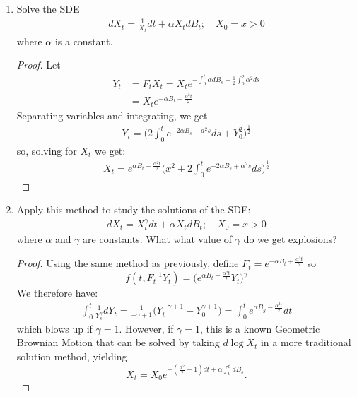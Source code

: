 \documentclass[11pt]{article}
\newcommand{\ga}{\alpha}
\newcommand{\gc}{y}
\renewcommand{\gc}{\gamma}
\begin{document}
\begin{enumerate}
\begin{proof}
 \end{proof}
 \item Solve the SDE \begin{align*}
 d X _ { t } = \frac { 1 } { X _ { t } } d t + \alpha X _ { t } d B _ { t } ; \quad X _ { 0 } = x > 0
 \end{align*}
 where $\ga$ is a constant.
 \begin{proof}
 Let \begin{align*}Y_t &= F_tX_t = X_t e^{-\int_0^t \ga dB_s + \frac{1}{2}\int_0^2 \ga^2 ds}\\
 &= X_t e^{-\ga B_t + \frac{\ga^2 t}{2}}
 \end{align*}
 Separating variables and integrating, we get
 \begin{align*}
 Y_t = \Big( 2 \int_0^t e^{-2 \ga B_s + a^2s} ds + Y_0^2 \Big)^{\frac{1}{2}}
 \end{align*}
 so, solving for $X_t$ we get:
 \begin{align*}
 X_t = e^{\ga B_t -\frac{\ga^2 t}{2}}\Big(x^2 + 2 \int_0^t e^{-2\ga B_s + \ga^2 s} ds \Big)^{\frac{1}{2}}
 \end{align*}
 \end{proof}
\item Apply this method to study the solutions of the SDE: 
\begin{align*}
d X _ { t } = X _ { t } ^ { \gamma } d t + \alpha X _ { t } d B _ { t } ; \quad X _ { 0 } = x > 0
\end{align*}
where $\ga$ and $\gamma$ are constants.  What what value of $\gamma$ do we get explosions?
\begin{proof}
Using the same method as previously, define $F_t = e^{-\ga B_t + \frac{\ga^2 t}{2}}$ so $$f(t,F_t^{-1}Y_t) = \Big( e^{\ga B_t - \frac{\ga^2 t}{2}} Y_t \Big)^{\gc}$$  We therefore have:
\begin{align*}
\int_0^t \frac{1}{Y_s^{\gc}} dY_t = \frac{1}{-\gc+1} \Big(Y_t^{-\gc+1}-Y_0^{\gc+1} \Big) = \int_0^t e^{\ga B_g - \frac{\ga^2 t}{2}}dt
\end{align*}
which blows up if $\gc = 1$.  However, if $\gc = 1$, this is a known Geometric Brownian Motion that can be solved by taking $d \log X_t$ in a more traditional solution method, yielding
$$X_t = X_0 e^{-(\frac{\ga^2}{2}-1) dt + \ga \int_0^t dB_s}.$$
\end{proof}
 \end{enumerate}
\end{document}
